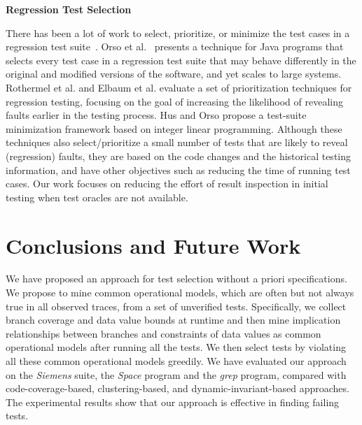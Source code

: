 \documentclass{sig-alternate}
\begin{document}
\textbf{Regression Test Selection} %

There has been a lot of work to select, prioritize, or minimize the
test cases in a regression test
suite~\cite{Elbaum02,Hsu09,Orso04,Rothermel01}. Orso et
al.~\cite{Orso04} presents a technique for Java programs that
selects every test case in a regression test suite that may behave
differently in the original and modified versions of the software,
and yet scales to large systems. Rothermel et al. \cite{Rothermel01}
and Elbaum et al. \cite{Elbaum02} evaluate a set of prioritization
techniques for regression testing, focusing on the goal of
increasing the likelihood of revealing faults earlier in the testing
process. Hus and Orso \cite{Hsu09} propose a test-suite minimization
framework based on integer linear programming. Although these
techniques also select/prioritize a small number of tests that are
likely to reveal (regression) faults, they are based on the code
changes and the historical testing information, and have other
objectives such as reducing the time of running test cases. Our work
focuses on reducing the effort of result inspection in initial
testing when test oracles are not available.




\vspace{-0.15in}

\section{Conclusions and Future Work}
\label{sec:conclusions}

We have proposed an approach for test selection without a priori
specifications. We propose to mine common operational models, which
are often but not always true in all observed traces, from a set of
unverified tests. Specifically, we collect branch coverage and data
value bounds at runtime and then mine implication relationships
between branches and constraints of data values as common
operational models after running all the tests. We then select tests
by violating all these common operational models greedily. We have
evaluated our approach on the {\it Siemens} suite, the {\it Space}
program and the {\it grep} program, compared with
code-coverage-based, clustering-based, and dynamic-invariant-based
approaches. The experimental results show that our approach is
effective in finding failing tests.
\end{document}
